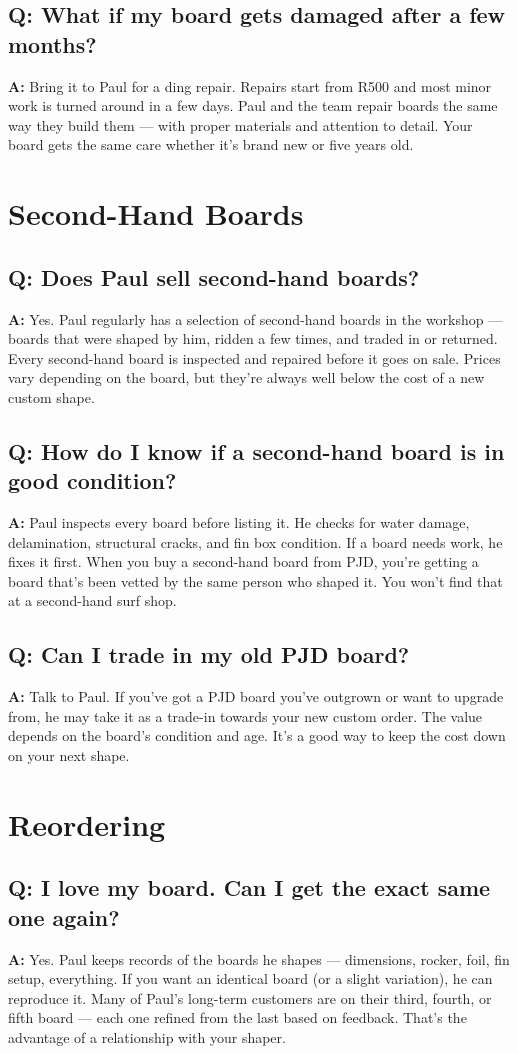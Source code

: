 \documentclass[11pt,a4paper]{article}
\newcommand{\question}[1]{\subsection*{Q: #1}}
\newcommand{\answer}{\noindent\textbf{A:} }
\begin{document}
\question{What if my board gets damaged after a few months?}
\answer Bring it to Paul for a ding repair. Repairs start from R500 and most minor work is turned around in a few days. Paul and the team repair boards the same way they build them --- with proper materials and attention to detail. Your board gets the same care whether it's brand new or five years old.

\section{Second-Hand Boards}

\question{Does Paul sell second-hand boards?}
\answer Yes. Paul regularly has a selection of second-hand boards in the workshop --- boards that were shaped by him, ridden a few times, and traded in or returned. Every second-hand board is inspected and repaired before it goes on sale. Prices vary depending on the board, but they're always well below the cost of a new custom shape.

\question{How do I know if a second-hand board is in good condition?}
\answer Paul inspects every board before listing it. He checks for water damage, delamination, structural cracks, and fin box condition. If a board needs work, he fixes it first. When you buy a second-hand board from PJD, you're getting a board that's been vetted by the same person who shaped it. You won't find that at a second-hand surf shop.

\question{Can I trade in my old PJD board?}
\answer Talk to Paul. If you've got a PJD board you've outgrown or want to upgrade from, he may take it as a trade-in towards your new custom order. The value depends on the board's condition and age. It's a good way to keep the cost down on your next shape.

\section{Reordering}

\question{I love my board. Can I get the exact same one again?}
\answer Yes. Paul keeps records of the boards he shapes --- dimensions, rocker, foil, fin setup, everything. If you want an identical board (or a slight variation), he can reproduce it. Many of Paul's long-term customers are on their third, fourth, or fifth board --- each one refined from the last based on feedback. That's the advantage of a relationship with your shaper.
\end{document}
